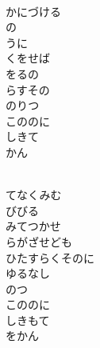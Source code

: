 \documentclass[10pt,b5j]{tarticle} %
\begin{document}
\begin{enumerate}
\begin{minipage}[c]{\blocksize}
    \end{minipage}
    \begin{minipage}[c]{\blocksize}
        
        \vspace{\linespace}
        \item~\\
        かにづける\\
        の\\
        うに\\
        くをせば\\
        をるの\\
        らすその\\
        のりつ\\
        こののに\\
        しきて\\
        かん
        
    \end{minipage}
    \begin{minipage}[c]{\blocksize}
        
        \vspace{\linespace}
        \item~\\
        てなくみむ\\
        びびる\\
        みてつかせ\\
        らがざせども\\
        ひたすらくそのに\\
        ゆるなし\\
        のつ\\
        こののに\\
        しきもて\\
        をかん
    
    \end{minipage}
\end{enumerate} %
\end{document}
